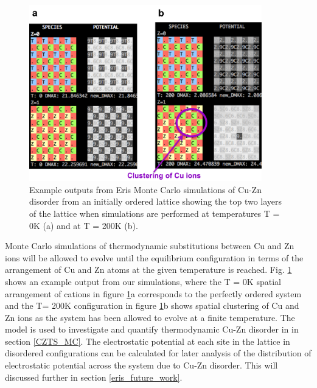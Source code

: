 \documentclass[11pt, twoside]{report}
\begin{document}
\begin{figure}[h!]
  \centering
    \includegraphics[width=0.9\textwidth]{figures/eris_spatial_disorder.png}
    \caption{Example outputs from Eris Monte Carlo simulations of Cu-Zn disorder from an initially ordered lattice showing the top two layers of the lattice when simulations are performed at temperatures T = 0K (a) and at T = 200K (b).}
  \label{eris_spatial_disorder}
\end{figure}

Monte Carlo simulations of thermodynamic substitutions between Cu and Zn ions will be allowed to evolve until the equilibrium configuration in terms of the arrangement of Cu and Zn atoms at the given temperature is reached. Fig. \ref{eris_spatial_disorder} shows an example output from our simulations, where the T = 0K spatial arrangement of cations in figure \ref{eris_spatial_disorder}a corresponds to the perfectly ordered system and the T= 200K configuration in figure \ref{eris_spatial_disorder}b shows spatial clustering of Cu and Zn ions as the system has been allowed to evolve at a finite temperature. The model is used to investigate and quantify thermodynamic Cu-Zn disorder in {\CZTS} in section \ref{CZTS_MC}. The electrostatic potential at each site in the lattice in disordered configurations can be calculated for later analysis of the distribution of electrostatic potential across the system due to Cu-Zn disorder. This will discussed further in section \ref{eris_future_work}. 
\end{document}
